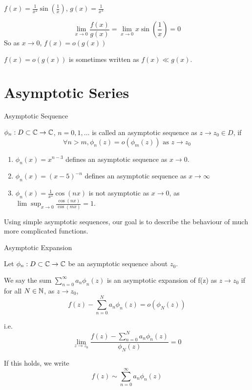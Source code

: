 \documentclass[a4paper]{article}
\begin{document}
\begin{eg}
	$f(x) = \frac{1}{x^2}\sin(\frac{1}{x})$, $g(x) = \frac{1}{x^3}$

	\[
		\lim_{x\to 0} \frac{f(x)}{g(x)} = \lim_{x\to 0} x \sin\left(\frac{1}{x}\right) = 0
	\]
	So as $x\to 0$, $f(x) = o\left( g(x) \right) $
\end{eg}

\begin{notation}

	$f(x) = o\left( g(x) \right) $ is sometimes written as $f(x) \ll g(x)$.
	
\end{notation}

\section{Asymptotic Series}

\begin{defn} Asymptotic Sequence
	
	$\phi_n : D \subset \mathbb{C} \to  \mathbb{C}$, $n = 0, 1, \ldots$ is called an asymptotic sequence as $z\to z_0 \in D$, if
	\[
		\forall n > m, \phi_n(z) = o\left( \phi_m(z) \right) \text{ as } z\to z_0
	\] 
\end{defn}

\begin{eg}
	\begin{enumerate}
		\item $\phi_n(x) = x^{n-3}$ defines an asymptotic sequence as $x\to 0$.

		\item $\phi_n(x) = (x-5)^{-n}$ defines an asymptotic sequence as $x\to \infty$

		\item $\phi_n(x) = \frac{1}{x^2}\cos(nx)$ is not asymptotic as $x\to 0$, as $\lim\sup_{x\to 0} \frac{\cos(nx)}{\cos(mx)} = 1$. 
	\end{enumerate}
\end{eg}

Using simple asymptotic sequences, our goal is to describe the behaviour of much more complicated functions.

\begin{defn} Asymptotic Expansion

	Let $\phi_n : D \subset \mathbb{C} \to \mathbb{C}$ be an asymptotic sequence about $z_0$.

	We say the sum $\sum_{n=0}^{\infty} a_n \phi_n(z)$ is an asymptotic expansion of f(z) as $z\to z_0$ if for all  $N \in \mathbb{N}$, as $z\to z_0$,
	\[
		f(z) - \sum_{n=0}^{N} a_n \phi_n(z) = o\left( \phi_N(z) \right) 
	\] 

	i.e. 
	\[
		\lim_{z\to z_0} \frac{f(z) - \sum_{n=0}^{N}a_n \phi_n(z)}{\phi_N(z)} = 0
	\]

	If this holds, we write
	\[
		f(z) \sim \sum_{n=0}^{\infty} a_n \phi_n(z)
	\] 
\end{defn}
\end{document}

